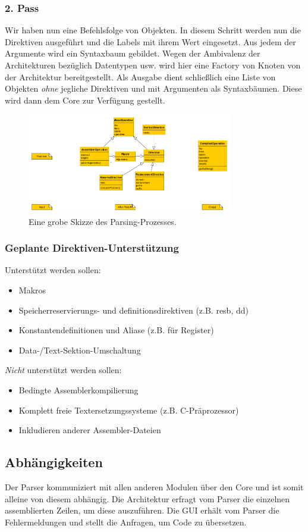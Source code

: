 \documentclass[a4paper]{article}
\begin{document}
\subsubsection{2. Pass}
Wir haben nun eine Befehlsfolge von Objekten. In diesem Schritt werden nun die Direktiven ausgeführt und die Labels mit ihrem Wert eingesetzt.
Aus jedem der Argumente wird ein Syntaxbaum gebildet. Wegen der Ambivalenz der Architekturen bezüglich Datentypen usw. wird hier eine Factory von Knoten von der Architektur bereitgestellt.
Als Ausgabe dient schließlich eine Liste von Objekten \emph{ohne} jegliche Direktiven und mit Argumenten als Syntaxbäumen. Diese wird dann dem Core zur Verfügung gestellt.
\begin{figure}
\centering
\includegraphics[width=0.8\textwidth]{process.png}
\caption{Eine grobe Skizze des Parsing-Prozesses.}
\end{figure}
\subsubsection{Geplante Direktiven-Unterstützung}
Unterstützt werden sollen:
\begin{itemize}
\item Makros
\item Speicherreservierungs- und definitionsdirektiven (z.B. resb, dd)
\item Konstantendefinitionen und Aliase (z.B. für Register)
\item Data-/Text-Sektion-Umschaltung
\end{itemize}
\emph{Nicht} unterstützt werden sollen:
\begin{itemize}
\item Bedingte Assemblerkompilierung
\item Komplett freie Textersetzungssysteme (z.B. C-Präprozessor)
\item Inkludieren anderer Assembler-Dateien
\end{itemize}
\subsection{Abhängigkeiten}
Der Parser kommuniziert mit allen anderen Modulen über den Core und ist somit alleine von diesem abhängig. 
Die Architektur erfragt vom Parser die einzelnen assemblierten Zeilen, um diese auszuführen.
Die GUI erhält vom Parser die Fehlermeldungen und stellt die Anfragen, um Code zu übersetzen.
\end{document}
